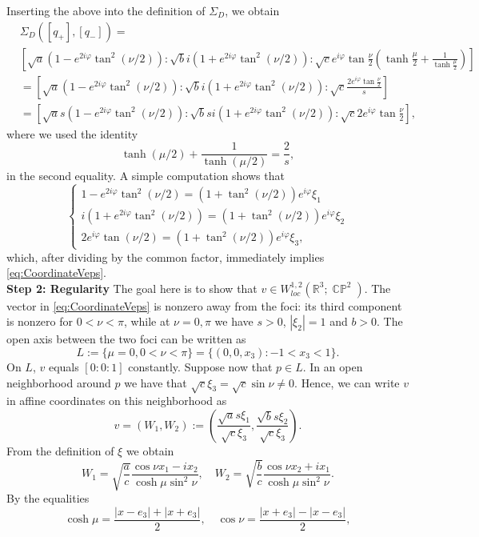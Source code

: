 \documentclass[11pt]{article}
\theoremstyle{plain}
\numberwithin{equation}{section}
\theoremstyle{definition}
\let\oldendproof\endproof
\renewenvironment{proof}[1][\proofname]{%
\oldproof[\upshape \bfseries #1]%
}{\oldendproof}
\def \R {\mathbb{R}}
\DeclareMathOperator{\CP}{\mathbb{CP}}
\begin{document}
\begin{proof}[Proof of Proposition \ref{prop:step3}]
\[    \]
    Inserting the above into the definition of $\Sigma_D$, we obtain
    \begin{align*}
        &\Sigma_D([q_+],[q_-])=\\
        &\left[\sqrt{a}(1-e^{2i\varphi}\tan^2(\nu/2)):\sqrt{b}i(1+e^{2i\varphi}\tan^2(\nu/2)):\sqrt{c}e^{i\varphi}\tan\frac{\nu}{2}\left(\tanh\frac{\mu}{2}+\frac{1}{\tanh\frac{\mu}{2}}\right)\right] \\
        &=\left[\sqrt{a}(1-e^{2i\varphi}\tan^2(\nu/2)):\sqrt{b}i(1+e^{2i\varphi}\tan^2(\nu/2)):\sqrt{c}\frac{2e^{i\varphi}\tan\frac{\nu}{2}}{s}\right] \\
        &=\left[\sqrt{a}s(1-e^{2i\varphi}\tan^2(\nu/2)):\sqrt{b}si(1+e^{2i\varphi}\tan^2(\nu/2)):\sqrt{c}2e^{i\varphi}\tan\frac{\nu}{2}\right],
    \end{align*}
    where we used the identity
    \[
    \tanh (\mu/2)+\frac{1}{\tanh (\mu/2)}=\frac{2}{s},
    \]
    in the second equality. A simple computation shows that
    \[
    \begin{cases}
        1-e^{2i\varphi}\tan^2(\nu/2)=(1+\tan^2(\nu/2))e^{i\varphi}\xi_1\\
        i(1+e^{2i\varphi}\tan^2(\nu/2))=(1+\tan^2(\nu/2))e^{i\varphi}\xi_2\\
        2e^{i\varphi}\tan(\nu/2)=(1+\tan^2(\nu/2))e^{i\varphi}\xi_3,
    \end{cases}
    \]
    which, after dividing by the common factor, immediately implies \eqref{eq:CoordinateVeps}.\\
    \textbf{Step 2: Regularity} The goal here is to show that $v \in W^{1,2}_{loc}(\R^3;\CP^2)$. The vector in \eqref{eq:CoordinateVeps} is nonzero away from the foci: its third component is nonzero for $0<\nu<\pi$, while at $\nu=0,\pi$ we have $s>0$, $|\xi_2|=1$ and $b>0$. The open axis between the two foci can be written as
    \[
    L:=\{\mu=0,0<\nu<\pi\}=\{(0,0,x_3):-1<x_3<1\}.
    \]
    On $L$, $v$ equals $[0:0:1]$ constantly. Suppose now that $p \in L$. In an open neighborhood around $p$ we have that $\sqrt{c}\xi_3=\sqrt{c}\sin\nu\neq 0$. Hence, we can write $v$ in affine coordinates on this neighborhood as
    \[
    v=(W_1,W_2):=\left(\frac{\sqrt{a}s\xi_1}{\sqrt{c}\xi_3},\frac{\sqrt{b}s\xi_2}{\sqrt{c}\xi_3}\right).
    \]
    From the definition of $\xi$ we obtain
    \[
    W_1= \sqrt{\frac{a}{c}}\frac{\cos \nu x_1 - i x_2}{\cosh \mu \sin^2 \nu},\quad W_2 =\sqrt{\frac{b}{c}}\frac{\cos \nu x_2+i x_1}{\cosh \mu \sin^2 \nu}.
    \]
    By the equalities
    \[
    \cosh\mu =\frac{|x-e_3|+|x+e_3|}{2},\quad \cos \nu =\frac{|x+e_3|-|x-e_3|}{2},
\]
\end{proof}
\end{document}
